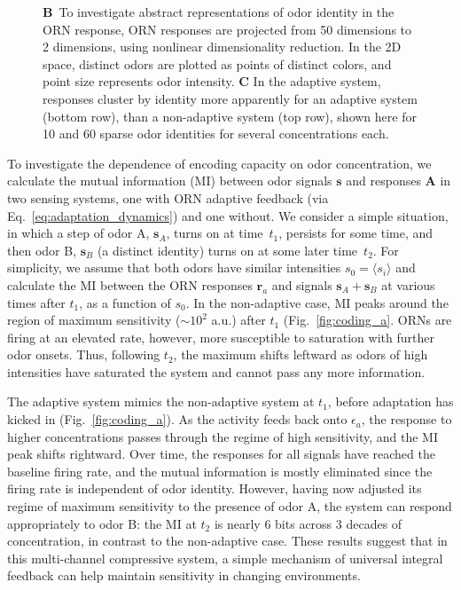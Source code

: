 \begin{figure}[!tb]
{{        \textbf{B}~To investigate abstract representations of odor identity in the ORN response, ORN responses are projected from 50 dimensions to 2 dimensions, using nonlinear dimensionality reduction. In the 2D space, distinct odors are plotted as points of distinct colors, and point size represents odor intensity. 
        \textbf{C} In the adaptive system, responses cluster by identity more apparently for an adaptive system (bottom row), than a non-adaptive system (top row), shown here for 10 and 60 sparse odor identities for several concentrations each.}} %
	\label{fig:coding}
\end{figure}

To investigate the dependence of encoding capacity on odor concentration, we calculate the mutual information (MI) between odor signals $\mathbf s$ and responses $\mathbf A$ in two sensing systems, one with ORN adaptive feedback (via Eq.~\ref{eq:adaptation_dynamics}) and one without. We consider a simple situation, in which a step of odor A, $\textbf{s}_A$,  turns on at time~$t_1$, persists for some time, and then odor B, $\mathbf s_B$ (a distinct identity) turns on at some later time~$t_2$. For simplicity, we assume that both odors have similar intensities $s_0 = \langle s_i \rangle$ and calculate the MI between the ORN responses $\mathbf {r}_a$ and signals $\mathbf s_A + \mathbf s_B$ at various times after $t_1$, as a function of $s_0$. In the non-adaptive case, MI peaks around the region of maximum sensitivity ($\sim 10^2$ a.u.) after $t_1$ (Fig.~\ref{fig:coding_a}. ORNs are firing at an elevated rate, however, more susceptible to saturation with further odor onsets. Thus, following $t_2$, the maximum shifts leftward as odors of high intensities have saturated the system and cannot pass any more information.

The adaptive system mimics the non-adaptive system at $t_1$,  before adaptation has kicked in (Fig.~\ref{fig:coding_a}). As the activity feeds back onto $\epsilon_a$, the response to higher concentrations passes through the regime of high sensitivity, and the MI peak shifts rightward. Over time, the responses for all signals have reached the baseline firing rate, and the mutual information is mostly eliminated since the firing rate is independent of odor identity. However, having now adjusted its regime of maximum sensitivity to the presence of odor A, the system can respond appropriately to odor B: the MI at $t_2$ is nearly 6 bits across 3 decades of concentration, in contrast to the non-adaptive case. These results suggest that in this multi-channel compressive system, a simple mechanism of universal integral feedback can help maintain sensitivity in changing environments.

